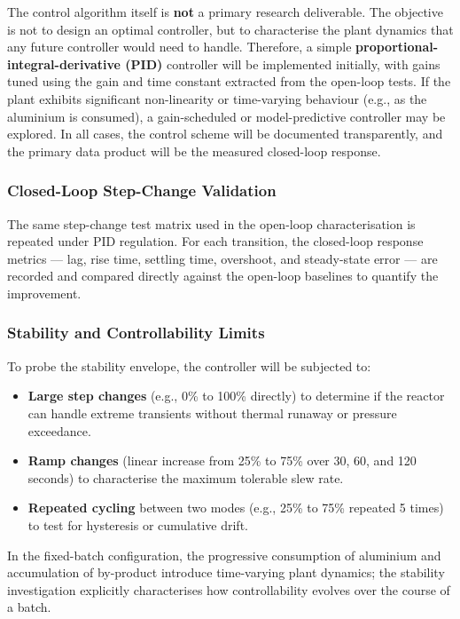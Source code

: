 \documentclass[12pt]{article}
\begin{document}
The control algorithm itself is \textbf{not} a primary research deliverable. The 
objective is not to design an optimal controller, but to characterise the plant 
dynamics that any future controller would need to handle. Therefore, a simple 
\textbf{proportional-integral-derivative (PID)} controller will be implemented 
initially, with gains tuned using the gain and time constant extracted from the 
open-loop tests. If the plant exhibits significant non-linearity or time-varying 
behaviour (e.g., as the aluminium is consumed), a gain-scheduled or model-predictive 
controller may be explored. In all cases, the control scheme will be documented 
transparently, and the primary data product will be the measured closed-loop 
response.

\subsubsection*{Closed-Loop Step-Change Validation}

The same step-change test matrix used in the open-loop characterisation is repeated 
under PID regulation. For each transition, the closed-loop response metrics --- lag, 
rise time, settling time, overshoot, and steady-state error --- are recorded and 
compared directly against the open-loop baselines to quantify the improvement.

\subsubsection*{Stability and Controllability Limits}

To probe the stability envelope, the controller will be subjected to:
\begin{itemize}
    \item \textbf{Large step changes} (e.g., 0\% to 100\% directly) to determine if 
    the reactor can handle extreme transients without thermal runaway or pressure 
    exceedance.
    \item \textbf{Ramp changes} (linear increase from 25\% to 75\% over 30, 60, and 
    120 seconds) to characterise the maximum tolerable slew rate.
    \item \textbf{Repeated cycling} between two modes (e.g., 25\% to 75\% repeated 
    5 times) to test for hysteresis or cumulative drift.
\end{itemize}

In the fixed-batch configuration, the progressive consumption of aluminium and 
accumulation of by-product introduce time-varying plant dynamics; the stability 
investigation explicitly characterises how controllability evolves over the course 
of a batch.
\end{document}
